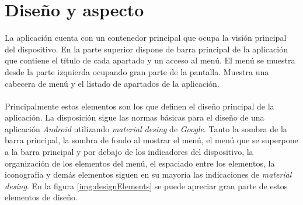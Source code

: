 \documentclass[../PFC.tex]{subfiles}
\begin{document}
\begin{usecase}


\end{usecase}

\section{Diseño y aspecto}
\label{App:Diseño y aspecto}

La aplicación cuenta con un contenedor principal que ocupa la visión principal del dispositivo. En la parte superior dispone de barra principal de la aplicación que contiene el título de cada apartado y un acceso al menú. El menú se muestra desde la parte izquierda ocupando gran parte de la pantalla. Muestra una cabecera de menú y el listado de apartados de la aplicación.
\\\\
Principalmente estos elementos son los que definen el diseño principal de la aplicación. La disposición sigue las normas básicas para el diseño de una aplicación \textit{Android} utilizando \textit{material desing} de \textit{Google}\cite{materialDesign}. Tanto la sombra de la barra principal, la sombra de fondo al mostrar el menú, el menú que se superpone a la barra principal y por debajo de los indicadores del dispositivo, la organización de los elementos del menú, el espaciado entre los elementos, la iconografía y demás elementos siguen en su mayoría las indicaciones de \textit{material desing}. En la figura \ref{img:designElements} se puede apreciar gran parte de estos elementos de diseño.
\end{document}
